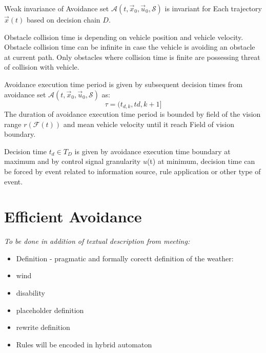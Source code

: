     \begin{definition}{Weak invariance of Avoidance set $\mathscr{A}(t,\vec{x}_0,\vec{u}_0,\mathscr{S})$} is invariant for Each trajectory $\vec{x}(t)$ based on decision chain $D$.
    \end{definition}
    
    \begin{definition}{Obstacle collision time} is depending on vehicle position and vehicle velocity. Obstacle collision time can be infinite in case the vehicle is avoiding an obstacle at current path. Only obstacles where collision time is finite are possessing threat of collision with vehicle. 
    \end{definition}
    
    \begin{definition}{Avoidance execution time period} is given by subsequent decision times from avoidance set $\mathscr{A}(t,\vec{x}_0,\vec{u}_0,\mathscr{S})$ as:
    \begin{equation}
        \tau = (t_{d,k},t{d,k+1}]
    \end{equation}
    The duration of avoidance execution time period is bounded by field of the vision range $r(\mathscr{F}(t))$ and mean vehicle velocity until it reach Field of vision boundary. 
    \end{definition}
    
    \begin{definition}{Decision time $t_d \in T_D$} is given by avoidance execution time boundary at maximum and by control signal granularity $u$(t) at minimum, decision time can be forced by event related to information source, rule application or other type of event. 
    \end{definition}
    
\section{Efficient Avoidance}\label{s:efficienctAvoidance}
    \emph{To be done in addition of textual description from meeting:}
    \begin{itemize}
        \item Definition - pragmatic and formally corectt definition of the weather:
	    \item wind
	    \item disability
	    \item placeholder definition
	    \item rewrite  definition
	    \item Rules will be encoded in hybrid automaton
    \end{itemize}
    

